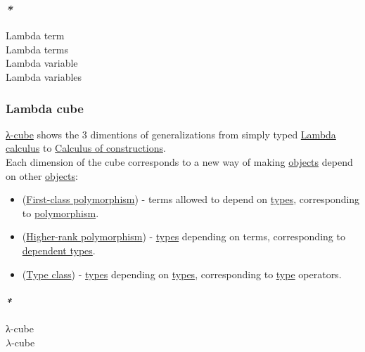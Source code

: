 \documentclass[11pt]{article}
\begin{document}
\subsubsection{\emph{*}}
\label{sec:org3823efc}

\label{org1f2edef}Lambda term\\
\label{org7b94fd3}Lambda terms\\
\label{org5b1e5dc}Lambda variable\\
\label{orgd000445}Lambda variables\\

\subsubsection{\label{org6c8bef7}Lambda cube}
\label{sec:orgd0aec72}
\hyperref[org63d24ad]{λ-cube} shows the 3 dimentions of generalizations from simply typed \hyperref[org37da5f9]{Lambda calculus} to \hyperref[org3cedf32]{Calculus of constructions}.\\

Each dimension of the cube corresponds to a new way of making \hyperref[org363acc2]{objects} depend on other \hyperref[org363acc2]{objects}:\\
\begin{itemize}
\item (\hyperref[org36726d8]{First-class polymorphism}) - terms allowed to depend on \hyperref[org4209edd]{types}, corresponding to \hyperref[org64df340]{polymorphism}.\\
\item (\hyperref[org2a1b1f6]{Higher-rank polymorphism}) - \hyperref[org4209edd]{types} depending on terms, corresponding to \hyperref[orga9e0480]{dependent types}.\\
\item (\hyperref[org16d8a26]{Type class}) - \hyperref[org4209edd]{types} depending on \hyperref[org4209edd]{types}, corresponding to \hyperref[orgc4aea2f]{type} operators.\\
\end{itemize}

\paragraph{\emph{*}}
\label{sec:org1b6dbe1}

\label{org63d24ad}λ-cube\\
\label{org7e99732}\(\lambda\)-cube\\
\end{document}
